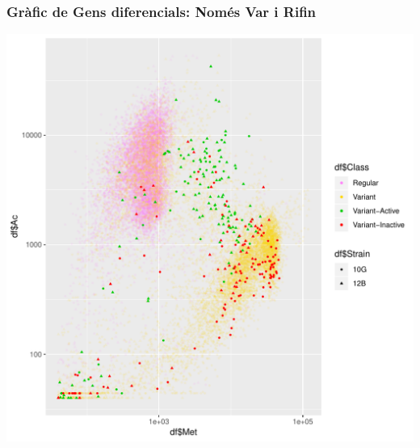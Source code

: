 \documentclass{article}\usepackage[]{graphicx}\usepackage[]{color}
\newenvironment{knitrout}{}{} %
\begin{document}
\subsubsection{Gràfic de Gens diferencials: Només Var i Rifin}
\begin{knitrout}
\color{fgcolor}

{\centering \includegraphics[width=1\linewidth]{figure/minimal-ac_met_log_status_10G_12B_varifin-1} 

}



\end{knitrout}
\clearpage
\end{document}
